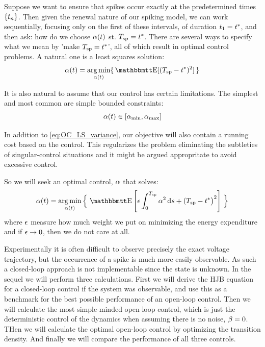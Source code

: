 \documentclass{article}
\begin{document}
Suppose we want to ensure that spikes occur exactly at the predetermined
times ${ \{t_n \} }$. Then given the renewal nature of our spiking model, we can work
sequentially, focusing only on the first of these intervals, of duration $t_1 =
{ t^* }$, and then ask: how do we choose ${\alpha}(t)$ st. ${ T_{\textrm{sp} } } = { t^* }$. There are several
ways to specify what we mean by 'make ${ T_{\textrm{sp} } } = { t^* }$', all of which result in optimal
control problems. A natural one is a least squares solution:
\begin{equation}
\a(t) = \argmin_{\a(t)} \{\, \Exp[(\ts- \T)^2] \,\}
\label{eq:OC_LS_variance}   
\end{equation}

It is also natural to assume that our control has certain limitations. The
simplest and most common are simple bounded constraints:
\begin{equation}
{\alpha}(t) \in [{ {\alpha}_{\textrm{min}} }, { {\alpha}_{\textrm{max}} }]
\label{eq:bound_constraints_alpha}
\end{equation}

In addition to \cref{eq:OC_LS_variance}, our objective will also contain a
running cost based on the control. This regularizes the problem eliminating the
subtleties of singular-control situations and it might be argued appropritate
to avoid excessive control.

So we will seek an optimal control, ${\alpha}$ that solves:
\begin{equation}
\a(t) = \argmin_{\a(t)} \Big\{ \,
\Exp\left[
\e \int_0^\ts  \a^2 \intd{s}
+  
(\ts - \T \big)^2 \right]  \, \Big\}
\label{eq:OC_LS_variance_energy}   
\end{equation}
where ${\epsilon}$ measure how much weight we put on minimizing the energy expenditure
and if ${\epsilon} \rightarrow 0$, then we do not care at all.

Experimentally it is often difficult to observe precisely the exact voltage
trajectory, but the occurrence of a spike is much more easily observable. As
such a closed-loop approach is not implementable since the state is unknown. In
the sequel we will perform three calculations. First we will derive the HJB
equation for a closed-loop control if the system was observable, and use this as
a benchmark for the best possible performance of an open-loop control. Then we
will calculate the most simple-minded open-loop control, which is just the
deterministic control of the dynamics when assuming there is no noise, ${\beta}=0$.
THen we will calculate the optimal open-loop control by optimizing the
transition density. And finally we will compare the performance of all three
controls.
\end{document}
